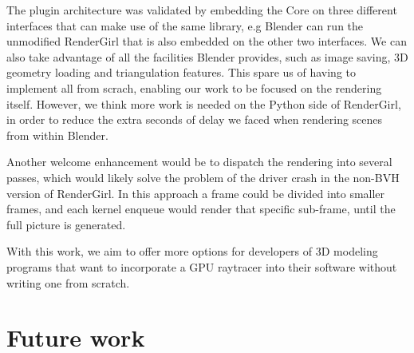 \documentclass{vgtc}
\begin{document}
The plugin architecture was validated by embedding the Core on three
different interfaces that can make use of the same library, e.g
Blender can run the unmodified RenderGirl that is also embedded on the
other two interfaces. We can also take advantage of all the facilities
Blender provides, such as image saving, 3D geometry loading and
triangulation features. This spare us of having to implement all from
scrach, enabling our work to be focused on the rendering
itself. However, we think more work is needed on the Python side of
RenderGirl, in order to reduce the extra seconds of delay we faced
when rendering scenes from within Blender.

Another welcome enhancement would be to dispatch the rendering into
several passes, which would likely solve the problem of the driver
crash in the non-BVH version of RenderGirl. In this approach a frame
could be divided into smaller frames, and each kernel enqueue would
render that specific sub-frame, until the full picture is generated.

With this work, we aim to offer more options for developers of 3D
modeling programs that want to incorporate a GPU raytracer into their
software without writing one from scratch.

\section{Future work}
\label{sec:future}






\end{document}
